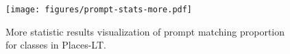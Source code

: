 \documentclass{article} \usepackage{iclr2023_conference,times}
\begin{document}
\begin{figure}
\begin{center}
\texttt{[image: figures/prompt-stats-more.pdf]}
\end{center}
\caption{More statistic results visualization of prompt matching proportion for classes in Places-LT. 
}
\label{fig:prompt_stats_more}
\end{figure}
\end{document}
